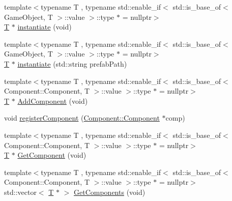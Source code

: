 \begin{DoxyCompactItemize}
\item 
{\footnotesize template$<$typename T , typename std\+::enable\+\_\+if$<$ std\+::is\+\_\+base\+\_\+of$<$ Game\+Object, T $>$\+::value $>$\+::type $\ast$  = nullptr$>$ }\\\mbox{\hyperlink{namespace_beer_engine_a94f0b552f6dc910de8cdb44207981f53a8de48e594408f9fc561b2f68ce05f664}{T}} $\ast$ \mbox{\hyperlink{class_beer_engine_1_1_game_object_ab88b7ff5e8aab52e54c02f9d103bbfcf}{instantiate}} (void)
\item 
{\footnotesize template$<$typename T , typename std\+::enable\+\_\+if$<$ std\+::is\+\_\+base\+\_\+of$<$ Game\+Object, T $>$\+::value $>$\+::type $\ast$  = nullptr$>$ }\\\mbox{\hyperlink{namespace_beer_engine_a94f0b552f6dc910de8cdb44207981f53a8de48e594408f9fc561b2f68ce05f664}{T}} $\ast$ \mbox{\hyperlink{class_beer_engine_1_1_game_object_ad523cd5783c0bfda02a9077af646e25b}{instantiate}} (std\+::string prefab\+Path)
\item 
{\footnotesize template$<$typename T , typename std\+::enable\+\_\+if$<$ std\+::is\+\_\+base\+\_\+of$<$ Component\+::\+Component, T $>$\+::value $>$\+::type $\ast$  = nullptr$>$ }\\\mbox{\hyperlink{namespace_beer_engine_a94f0b552f6dc910de8cdb44207981f53a8de48e594408f9fc561b2f68ce05f664}{T}} $\ast$ \mbox{\hyperlink{class_beer_engine_1_1_game_object_a62e1af180bc3c2cd12c06153ac06aa3a}{Add\+Component}} (void)
\item 
void \mbox{\hyperlink{class_beer_engine_1_1_game_object_a1454d7ec7fc8d98d621ae9be166976e4}{register\+Component}} (\mbox{\hyperlink{class_beer_engine_1_1_component_1_1_component}{Component\+::\+Component}} $\ast$comp)
\item 
{\footnotesize template$<$typename T , typename std\+::enable\+\_\+if$<$ std\+::is\+\_\+base\+\_\+of$<$ Component\+::\+Component, T $>$\+::value $>$\+::type $\ast$  = nullptr$>$ }\\\mbox{\hyperlink{namespace_beer_engine_a94f0b552f6dc910de8cdb44207981f53a8de48e594408f9fc561b2f68ce05f664}{T}} $\ast$ \mbox{\hyperlink{class_beer_engine_1_1_game_object_a70a24bb3e511f2ff0488b80c65e88f9f}{Get\+Component}} (void)
\item 
{\footnotesize template$<$typename T , typename std\+::enable\+\_\+if$<$ std\+::is\+\_\+base\+\_\+of$<$ Component\+::\+Component, T $>$\+::value $>$\+::type $\ast$  = nullptr$>$ }\\std\+::vector$<$ \mbox{\hyperlink{namespace_beer_engine_a94f0b552f6dc910de8cdb44207981f53a8de48e594408f9fc561b2f68ce05f664}{T}} $\ast$ $>$ \mbox{\hyperlink{class_beer_engine_1_1_game_object_acab5c2fff0115dcc68ce12c051d254a7}{Get\+Components}} (void)

\end{DoxyCompactItemize}
